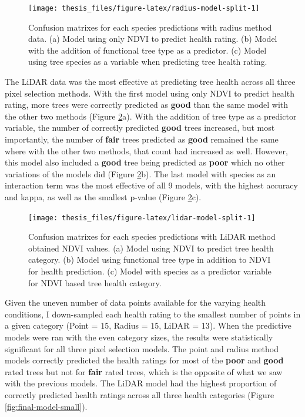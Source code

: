 \documentclass[12pt,twoside]{reedthesis}
\begin{document}
\begin{figure}

{\centering \texttt{[image: thesis\_files/figure-latex/radius-model-split-1]} 

}

\caption[Confusion matrixes for Radius method predictive models]{Confusion matrixes for each species predictions with radius method data. (a) Model using only NDVI to predict health rating. (b) Model with the addition of functional tree type as a predictor. (c) Model using tree species as a variable when predicting tree health rating.}\label{fig:radius-model-split}
\end{figure}
The LiDAR data was the most effective at predicting tree health across all three pixel selection methods. With the first model using only NDVI to predict health rating, more trees were correctly predicted as \textbf{good} than the same model with the other two methods (Figure \ref{fig:lidar-model-split}a). With the addition of tree type as a predictor variable, the number of correctly predicted \textbf{good} trees increased, but most importantly, the number of \textbf{fair} trees predicted as \textbf{good} remained the same where with the other two methods, that count had increased as well. However, this model also included a \textbf{good} tree being predicted as \textbf{poor} which no other variations of the models did (Figure \ref{fig:lidar-model-split}b). The last model with species as an interaction term was the most effective of all 9 models, with the highest accuracy and kappa, as well as the smallest p-value (Figure \ref{fig:lidar-model-split}c).
\begin{figure}

{\centering \texttt{[image: thesis\_files/figure-latex/lidar-model-split-1]} 

}

\caption[Confusion matrixes for LiDAR method predictive models]{Confusion matrixes for each species predictions with LiDAR method obtained NDVI values. (a) Model using NDVI to predict tree health category. (b) Model using functional tree type in addition to NDVI for health prediction. (c) Model with species as a predictor variable for NDVI based tree health category.}\label{fig:lidar-model-split}
\end{figure}
Given the uneven number of data points available for the varying health conditions, I down-sampled each health rating to the smallest number of points in a given category (Point = 15, Radius = 15, LiDAR = 13). When the predictive models were ran with the even category sizes, the results were statistically significant for all three pixel selection models. The point and radius method models correctly predicted the health ratings for most of the \textbf{poor} and \textbf{good} rated trees but not for \textbf{fair} rated trees, which is the opposite of what we saw with the previous models. The LiDAR model had the highest proportion of correctly predicted health ratings across all three health categories (Figure \ref{fig:final-model-small}).
\end{document}
